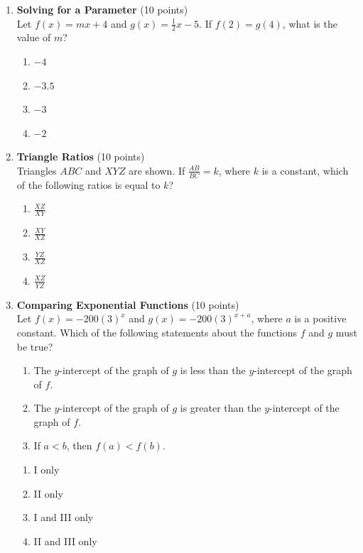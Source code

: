 \begin{enumerate}
  \item \textbf{Solving for a Parameter} (10 points)\\
  Let $f(x) = m x + 4$ and $g(x) = \frac{1}{2}x - 5$. If $f(2) = g(4)$, what is the value of $m$?
  \begin{enumerate}[label=(\Alph*)]
    \item $-4$
    \item $-3.5$
    \item $-3$
    \item $-2$
  \end{enumerate}
  \begin{subanswer}
  \end{subanswer}

  \newpage

  \item \textbf{Triangle Ratios} (10 points)\\
  Triangles $ABC$ and $XYZ$ are shown. If $\frac{AB}{BC}=k$, where $k$ is a constant, which of the following ratios is equal to $k$?
  \begin{enumerate}[label=(\Alph*)]
    \item $\frac{XZ}{XY}$
    \item $\frac{XY}{XZ}$
    \item $\frac{YZ}{XZ}$
    \item $\frac{XZ}{YZ}$
  \end{enumerate}
  \begin{subanswer}
  \end{subanswer}

  \item \textbf{Comparing Exponential Functions} (10 points)\\
  Let $f(x) = -200(3)^x$ and $g(x) = -200(3)^{x+a}$, where $a$ is a positive constant. Which of the following statements about the functions $f$ and $g$ must be true?
  \begin{enumerate}[label=(\Roman*)]
    \item The $y$-intercept of the graph of $g$ is less than the $y$-intercept of the graph of $f$.
    \item The $y$-intercept of the graph of $g$ is greater than the $y$-intercept of the graph of $f$.
    \item If $a < b$, then $f(a) < f(b)$.
  \end{enumerate}
  \begin{enumerate}[label=(\Alph*)]
    \item I only
    \item II only
    \item I and III only
    \item II and III only
  \end{enumerate}
  \begin{subanswer}
  \end{subanswer}


\end{enumerate}

